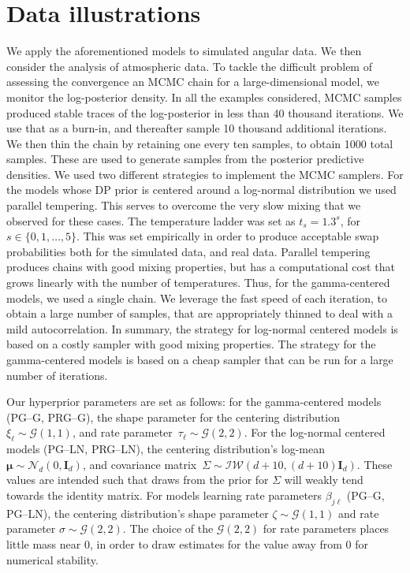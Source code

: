 \section{Data illustrations\label{sec:results}} 
We apply the aforementioned models to simulated angular data. We then consider the analysis
    of atmospheric data. To tackle the difficult problem of assessing the convergence 
    an MCMC chain for a large-dimensional model, we monitor the log-posterior 
    density. In all the examples considered, MCMC samples produced stable traces of the
    log-posterior in less than 40 thousand  iterations. We use that as a burn-in, 
    and thereafter sample 10 thousand additional iterations. We then thin the chain by retaining one
    every ten samples, to obtain 1000 total samples. These are used to generate samples from the 
    posterior predictive densities. We used two different strategies to implement the MCMC samplers.
    For the models whose DP prior is centered around a log-normal distribution we used parallel 
    tempering. This serves to overcome the very slow mixing that we observed for these cases.
    The temperature ladder was set as $t_s = 1.3^{s}$,  for $s \in \lbrace0,1,\ldots,5\rbrace$. This was 
    set empirically in order to produce acceptable swap probabilities both for the simulated data, 
    and real data. Parallel tempering produces chains with good mixing properties, but has a 
    computational cost that  grows linearly with the number of temperatures. Thus, for the 
    gamma-centered models, we used a single chain. We leverage the fast speed of each iteration, 
    to obtain a large number of samples, that are appropriately thinned to deal with a mild
    autocorrelation. In summary, the strategy for log-normal centered models is based on a costly
    sampler with good mixing properties. The strategy for the gamma-centered models is based on
    a cheap sampler that can be run for a large number of iterations.

Our hyperprior parameters are set as follows: for the gamma-centered models (PG--G, PRG--G), 
    the shape parameter for the centering 
    distribution~$\xi_{\ell}\sim \mathcal{G}\left(1,1\right)$, and
    rate parameter~$\tau_{\ell}\sim\mathcal{G}\left(2,2\right)$.
    For the log-normal centered models (PG--LN, PRG--LN), the centering distribution's
    log-mean $\bm{\mu}\sim\mathcal{N}_d\left(0,\bm{I}_d\right)$, and covariance 
    matrix~$\Sigma\sim\mathcal{IW}\left(d + 10, (d+10)\bm{I}_{d}\right)$.  These values are 
    intended such that draws from the prior for $\Sigma$ will weakly tend towards the 
    identity matrix.
    For models learning rate parameters $\beta_{j\ell}$ (PG--G, PG--LN), the centering
    distribution's shape parameter $\zeta\sim\mathcal{G}\left(1,1\right)$ and rate parameter
    $\sigma\sim\mathcal{G}\left(2,2\right)$.  The choice of the $\mathcal{G}(2,2)$ for rate
    parameters places little mass near 0, in order to draw estimates for the value away from 
    0 for numerical stability.

